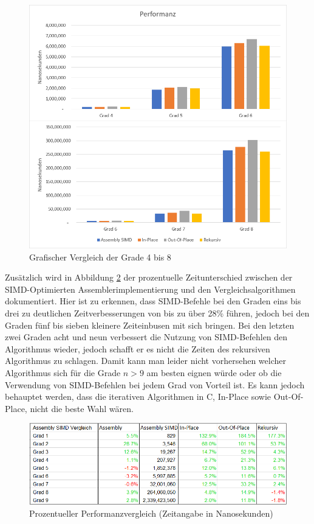 \documentclass[course=asp]{aspdoc}
\begin{document}
\begin{figure}[ht]
\centering
\includegraphics[scale = 0.5]{diagrammeVertikal.png}
\caption{Grafischer Vergleich der Grade 4 bis 8}\label{Abb: Diagramm Performanz}
\captionsetup[figure]{font=small,labelfont=small}
\end{figure}

Zus\"atzlich wird in Abbildung \ref{Abb: Tabelle Performanz} der prozentuelle Zeitunterschied zwischen der SIMD-Optimierten Assemblerimplementierung und den Vergleichsalgorithmen dokumentiert. Hier ist zu erkennen, dass SIMD-Befehle bei den Graden eins bis drei zu deutlichen Zeitverbesserungen von bis zu \"uber 28\% f\"uhren, jedoch bei den Graden f\"unf bis sieben kleinere Zeiteinbusen mit sich bringen. Bei den letzten zwei Graden acht und neun verbessert die Nutzung von SIMD-Befehlen den Algorithmus wieder, jedoch schafft er es nicht die Zeiten des rekursiven Algorithmus zu schlagen.
Damit kann man leider nicht vorhersehen welcher Algorithmus sich f\"ur die Grade $n > 9$ am besten eignen w\"urde oder ob die Verwendung von SIMD-Befehlen bei jedem Grad von Vorteil ist. Es kann jedoch behauptet werden, dass die iterativen Algorithmen in C, In-Place sowie Out-Of-Place, nicht die beste Wahl w\"aren.

\begin{figure}[ht]
\centering
\includegraphics[scale = 0.65]{zeitmessungenProzent.png}
\caption{Prozentueller Performanzvergleich (Zeitangabe in Nanosekunden)}\label{Abb: Tabelle Performanz}
\captionsetup[figure]{font=small,labelfont=small}
\end{figure}
\end{document}
